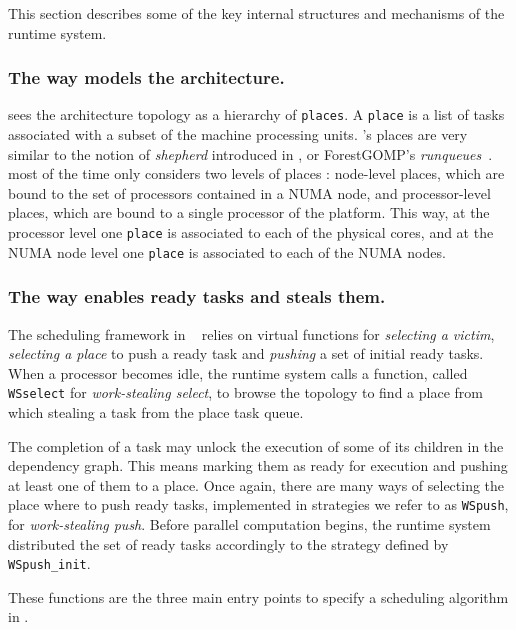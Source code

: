 \documentclass[parallelisme]{compas2016}
\begin{document}
This section describes some of the key internal structures and mechanisms of the \kaapi runtime system.

\vspace*{-1ex}
\subsubsection{The way \kaapi models the architecture.}


\kaapi sees the architecture topology as a hierarchy of \verb/places/.
A \verb/place/ is a list of tasks associated with a subset of the machine processing units.
\kaapi's places are very similar to the notion of \emph{shepherd} introduced in \cite{DBLP:journals/ijhpca/OlivierPWSP12}, or ForestGOMP's \emph{runqueues}~\cite{BroFurGogWacNam10IJPP}.
\kaapi most of the time only considers two levels of places : node-level places, which are bound to the set of processors contained in a NUMA node, and processor-level places, which are bound to a single processor of the platform.
This way, at the processor level one \verb/place/ is associated to each of the physical cores, and
at the NUMA node level one \verb/place/ is associated to each of the NUMA nodes.


\subsubsection{The way \kaapi enables ready tasks and steals them.}
The scheduling framework in \kaapi~\cite{Bleuse2014} relies on virtual functions for \textit{selecting a victim}, \textit{selecting a place} to push a ready task and \textit{pushing} a set of initial ready tasks.
When a processor becomes idle, the runtime system calls a function, called  \verb/WSselect/ for \emph{work-stealing select}, to browse the topology to find a place from which stealing a task from the place task queue.

The completion of a task may unlock the execution of some of its children in the dependency graph.
This means marking them as ready for execution and pushing at least one of them to a place.
Once again, there are many ways of selecting the place where to push ready tasks, implemented in strategies we refer to as \verb/WSpush/, for \emph{work-stealing push}.
Before parallel computation begins, the runtime system distributed the set of ready tasks accordingly to the strategy defined by \verb/WSpush_init/.

These functions are the three main entry points to specify a scheduling algorithm in \kaapi. 
\end{document}
